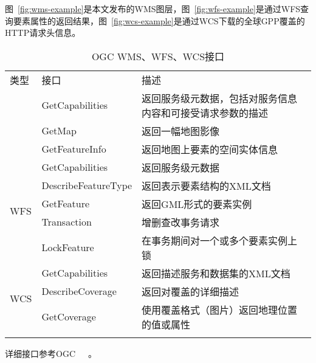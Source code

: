图~\ref{fig:wms-example}是本文发布的WMS图层，图~\ref{fig:wfs-example}是通过WFS查询要素属性的返回结果，图~\ref{fig:wcs-example}是通过WCS下载的全球GPP覆盖的HTTP请求头信息。

\begin{table}
    \centering
    \caption{OGC WMS、WFS、WCS接口}
    \label{tab:OGC-WMS-WFS-WCS}
    \begin{threeparttable}
        \begin{tabular}{ l | l l}
            \Xhline{1.5pt}
            类型 & 接口 & 描述 \\
            \Xhline{1.5pt}
            \multirow{3}{*}{WMS} & GetCapabilities & \multicolumn{1}{m{0.6\columnwidth}}{返回服务级元数据，包括对服务信息内容和可接受请求参数的描述} \\
            \cline{2-3}
            & GetMap & 返回一幅地图影像 \\
            \cline{2-3}
            & GetFeatureInfo & 返回地图上要素的空间实体信息 \\
            \hline
            \multirow{5}{*}{WFS} & GetCapabilities & 返回服务级元数据 \\
            \cline{2-3}
            & DescribeFeatureType & 返回表示要素结构的XML文档 \\
            \cline{2-3}
            & GetFeature & 返回GML形式的要素实例 \\
            \cline{2-3}
            & Transaction & 增删查改事务请求 \\
            \cline{2-3}
            & LockFeature & 在事务期间对一个或多个要素实例上锁 \\
            \hline
            \multirow{3}{*}{WCS} & GetCapabilities & 返回描述服务和数据集的XML文档 \\
            \cline{2-3}
            & DescribeCoverage & 返回对覆盖的详细描述 \\
            \cline{2-3}
            & GetCoverage & 使用覆盖格式（图片）返回地理位置的值或属性 \\
            \Xhline{1.5pt}
        \end{tabular}
        \begin{tablenotes}
            \footnotesize
            \item 详细接口参考OGC~\cite{OGC-WMS}~\cite{OGC-WFS}~\cite{OGC-WCS}。
        \end{tablenotes}
    \end{threeparttable}
\end{table}



